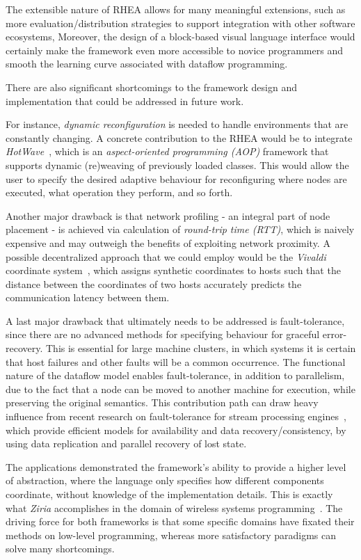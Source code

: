 \documentclass[sigplan,review,anonymous]{acmart}
\begin{document}
The extensible nature of \textsc{RHEA} allows for many meaningful extensions, such as
more evaluation/distribution strategies to support integration with other software ecosystems,
Moreover, the design of a block-based visual language interface would certainly make the
framework even more accessible to novice programmers and smooth the learning curve
associated with dataflow programming.

There are also significant shortcomings to the framework design and implementation that
could be addressed in future work.

For instance, \textit{dynamic reconfiguration} is needed to handle environments that are constantly changing.
A concrete contribution to the \textsc{RHEA} would be to integrate \textit{HotWave}~\cite{reconf_java},
which is an \textit{aspect-oriented programming (AOP)} framework that supports dynamic
(re)weaving of previously loaded classes. This would allow the user to specify the desired
adaptive behaviour for reconfiguring where nodes are executed, what operation they perform, and so forth.

Another major drawback is that network profiling - an integral part of node placement - is achieved via
calculation of \textit{round-trip time (RTT)}, which is naively expensive and may outweigh the benefits of
exploiting network proximity. A possible decentralized approach that we could employ would be the \textit{Vivaldi}
coordinate system~\cite{vivaldi}, which assigns synthetic coordinates to hosts
such that the distance between the coordinates of two hosts accurately predicts
the communication latency between them.

A last major drawback that ultimately needs to be addressed is fault-tolerance,
since there are no advanced methods for specifying behaviour for graceful
error-recovery. This is essential for large machine clusters, in which systems it is
certain that host failures and other faults will be a common occurrence. The
functional nature of the dataflow model enables fault-tolerance, in addition to
parallelism, due to the fact that a node can be moved to another machine for
execution, while preserving the original semantics.  This contribution path can draw
heavy influence from recent research on fault-tolerance for stream processing engines~\cite{borealis,wide_area},
which provide efficient models for availability and data recovery/consistency,
by using data replication and parallel recovery of lost state.

The applications demonstrated the framework's ability to provide a higher level
of abstraction, where the language only specifies how different components
coordinate, without knowledge of the implementation details. This is exactly
what \textit{Ziria} accomplishes in the domain of wireless systems
programming~\cite{ziria}. The driving force for both frameworks is that some
specific domains have fixated their methods on low-level programming, whereas
more satisfactory paradigms can solve many shortcomings.
\end{document}
